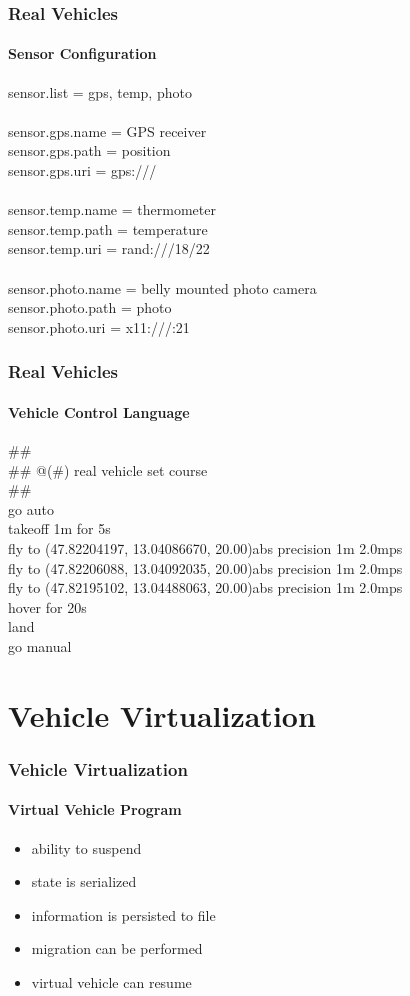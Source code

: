 \documentclass{beamer}
\begin{document}
\begin{frame}\frametitle{Real Vehicles}\framesubtitle{Sensor Configuration}
sensor.list = gps, temp, photo \\
\\
sensor.gps.name = GPS receiver \\
sensor.gps.path = position \\
sensor.gps.uri = gps:/// \\
\\
sensor.temp.name = thermometer \\
sensor.temp.path = temperature \\
sensor.temp.uri = rand:///18/22 \\
\\
sensor.photo.name = belly mounted photo camera \\
sensor.photo.path = photo \\
sensor.photo.uri = x11:///:21
\end{frame}


\begin{frame}\frametitle{Real Vehicles}\framesubtitle{Vehicle Control Language}
\#\# \\
\#\# @(\#) real vehicle set course \\
\#\# \\
go auto \\
takeoff 1m for 5s \\
fly to (47.82204197, 13.04086670, 20.00)abs precision 1m 2.0mps \\
fly to (47.82206088, 13.04092035, 20.00)abs precision 1m 2.0mps \\
fly to (47.82195102, 13.04488063, 20.00)abs precision 1m 2.0mps \\
hover for 20s \\
land \\
go manual
\end{frame}


\section{Vehicle Virtualization}

\begin{frame}\frametitle{Vehicle Virtualization}\framesubtitle{Virtual Vehicle Program}
\begin{itemize}
\item ability to suspend
\item state is serialized
\item information is persisted to file
\item migration can be performed
\item virtual vehicle can resume
\end{itemize} 
\end{frame}
\end{document}
